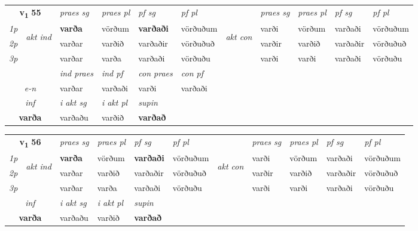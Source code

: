 \noindent
\begin{tabular}{lllllllllll} \toprule
\multicolumn{2}{c}{\textbf{v{\textsubscript{1}}} \Large{\textbf{55}}}  &  \textit{praes sg}  & \textit{praes pl}  &\textit{ pf sg} & \textit{pf pl} &  &  \textit{praes sg}  & \textit{praes pl}  & \textit{pf sg} & \textit{pf pl } \\*
	\cmidrule{3-6} \cmidrule{8-11}
 {\textit{1p}} & \multirow{3}{*}{\begin{turn}{90}\textit{akt ind}\end{turn}} & \textbf{varða} & vörðum & \textbf{varðaði} & vörðuðum & \multirow{3}{*}{\begin{turn}{90}\textit{akt con}\end{turn}} &varði & vörðum & varðaði & vörðuðum\\*
 {\textit{2p}} &  &  varðar  & varðið & varðaðir & vörðuðuð & & varðir & varðið & varðaðir & vörðuðuð \\*
{\textit{3p}} &  & varðar & varða & varðaði & vörðuðu & & varði & varði& varðaði & vörðuðu \\*
\cmidrule{3-6} \cmidrule{8-11}

   & &  \textit{ind praes} & \textit{ind pf} & \textit{con praes} & \textit{con pf} \\*
\multicolumn{2}{c}{ \textit{e-n} } & varðar & varðaði & varði & varðaði \\*

\cmidrule{3-5}
   \multicolumn{2}{c}{\textit{inf}}  & \textit{i akt sg} & \textit{i akt pl}    & \textit{supin}   \\*
  \multicolumn{2}{c}{\textbf{varða}} & varðaðu  & varðið    &  \textbf{varðað}   \\*
\end{tabular}

\noindent
\begin{tabular}{lllllllllll} \toprule
\multicolumn{2}{c}{\textbf{v{\textsubscript{1}}} \Large{\textbf{56}}}  &  \textit{praes sg}  & \textit{praes pl}  &\textit{ pf sg} & \textit{pf pl} &  &  \textit{praes sg}  & \textit{praes pl}  & \textit{pf sg} & \textit{pf pl } \\*
	\cmidrule{3-6} \cmidrule{8-11}
 {\textit{1p}} & \multirow{3}{*}{\begin{turn}{90}\textit{akt ind}\end{turn}} & \textbf{varða} & vörðum & \textbf{varðaði} & vörðuðum & \multirow{3}{*}{\begin{turn}{90}\textit{akt con}\end{turn}} &varði & vörðum & varðaði & vörðuðum\\*
 {\textit{2p}} &  &  varðar  & varðið & varðaðir & vörðuðuð & & varðir & varðið & varðaðir & vörðuðuð \\*
{\textit{3p}} &  & varðar & varða & varðaði & vörðuðu & & varði & varði& varðaði & vörðuðu \\*
\cmidrule{3-6} \cmidrule{8-11}

   \multicolumn{2}{c}{\textit{inf}}  & \textit{i akt sg} & \textit{i akt pl}    & \textit{supin}   \\*
  \multicolumn{2}{c}{\textbf{varða}} & varðaðu  & varðið    &  \textbf{varðað}   \\*
\end{tabular}

